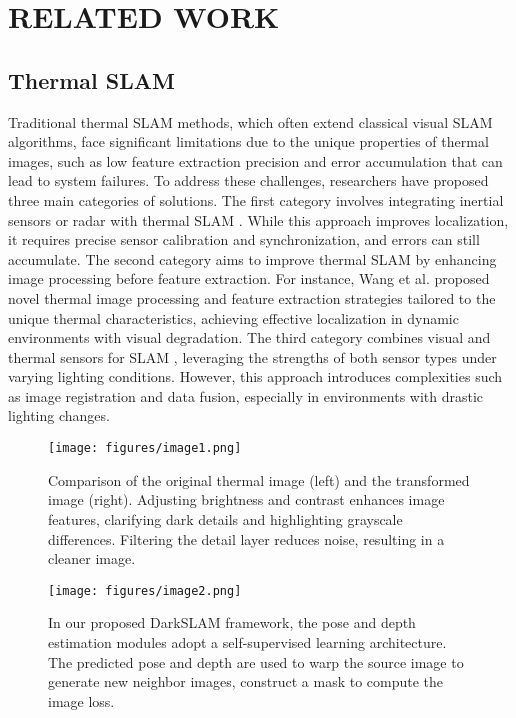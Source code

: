 \section{RELATED WORK}
\subsection{Thermal SLAM}
Traditional thermal SLAM methods, which often extend classical visual SLAM algorithms, face significant limitations due to the unique properties of thermal images, such as low feature extraction precision and error accumulation that can lead to system failures. To address these challenges, researchers have proposed three main categories of solutions.
The first category involves integrating inertial sensors or radar with thermal SLAM  \cite{CHOI2023222}. While this approach improves localization, it requires precise sensor calibration and synchronization, and errors can still accumulate.
The second category aims to improve thermal SLAM by enhancing image processing before feature extraction\cite{9804793}. 
For instance, Wang et al\cite{10048516}. proposed novel thermal image processing and feature extraction strategies tailored to the unique thermal characteristics, achieving effective localization in dynamic environments with visual degradation.
The third category combines visual and thermal sensors for SLAM  \cite{10111061}, leveraging the strengths of both sensor types under varying lighting conditions. However, this approach introduces complexities such as image registration and data fusion, especially in environments with drastic lighting changes.
\begin{figure}
    \centering
    \texttt{[image: figures/image1.png]}
    \caption{Comparison of the original thermal image (left) and the transformed image (right). Adjusting brightness and contrast enhances image features, clarifying dark details and highlighting grayscale differences. Filtering the detail layer reduces noise, resulting in a cleaner image.}
\label{fig:deeptio_arch_test2}
\end{figure}
\begin{figure*}
\centering
\texttt{[image: figures/image2.png]}
\caption{In our proposed DarkSLAM framework, the pose and depth estimation modules adopt a self-supervised learning architecture. The predicted pose
and depth are used to warp the source image to generate new neighbor images, construct a mask to compute the image loss. }
\label{fig:deeptio_arch_train3}
\end{figure*}

